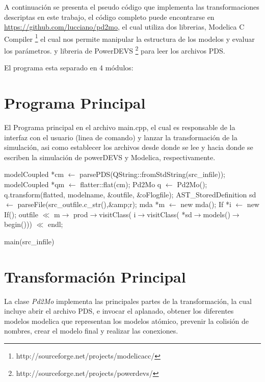 	A continuación se presenta el pseudo código que implementa las transformaciones descriptas en este trabajo, 
	el código completo puede encontrarse en \url{https://github.com/lucciano/pd2mo}, el cual utiliza dos librerias, Modelica C Compiler 
	\footnote{http://sourceforge.net/projects/modelicacc/} el cual nos permite manipular la estructura de los modelos y evaluar los parámetros.
y libreria de PowerDEVS \footnote{http://sourceforge.net/projects/powerdevs/} para leer los archivos PDS.

El programa esta separado en 4 módulos:

\section{Programa Principal}

El Programa principal en el archivo main.cpp, el cual es responsable de la interfaz con el usuario (linea de comando) y lanzar la transformación de la simulación, asi como establecer los archivos desde donde se lee y hacia donde se escriben la simulación de powerDEVS y Modelica, respectivamente.


\begin{algorithm}[H]
\begin{algorithmic}[1]
\State modelCoupled *cm $\gets$ parsePDS(QString::fromStdString(src\_infile));
\State modelCoupled *qm $\gets$ flatter::flat(cm);
\State Pd2Mo q $\gets$ Pd2Mo();
\State q.transform(flatted, modelname, \&outfile, \&oFlogfile);
\State AST\_StoredDefinition sd $\gets$ parseFile(src\_outfile.c\_str(),\&amp;r);
\State mda *m $\gets$ new mda();
\State If *i $\gets$ new If();
\State outfile $\ll$ m$\rightarrow$ 
		{prod$\rightarrow$visitClass( i$\rightarrow$visitClass( 
			*sd$\rightarrow$models()$\rightarrow$begin()))} $\ll$ endl;

\end{algorithmic}
\caption{main(src\_infile)}
\end{algorithm}

\section{Transformación Principal}
La clase \emph{Pd2Mo} implementa las principales partes de la transformación, la cual incluye abrir el archivo PDS, e invocar el aplanado, obtener los diferentes modelos modelica que representan los modelos atómico, prevenir la colisión de nombres, crear el modelo final y realizar las conexiones.


